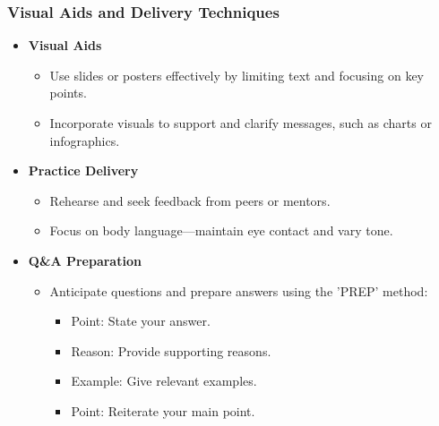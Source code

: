 \documentclass{beamer}
\begin{document}
\begin{frame}[fragile]
    \frametitle{Visual Aids and Delivery Techniques}
    \begin{itemize}
        \item \textbf{Visual Aids}
        \begin{itemize}
            \item Use slides or posters effectively by limiting text and focusing on key points.
            \item Incorporate visuals to support and clarify messages, such as charts or infographics.
        \end{itemize}

        \item \textbf{Practice Delivery}
        \begin{itemize}
            \item Rehearse and seek feedback from peers or mentors.
            \item Focus on body language—maintain eye contact and vary tone.
        \end{itemize}

        \item \textbf{Q\&A Preparation}
        \begin{itemize}
            \item Anticipate questions and prepare answers using the 'PREP' method:
            \begin{itemize}
                \item Point: State your answer.
                \item Reason: Provide supporting reasons.
                \item Example: Give relevant examples.
                \item Point: Reiterate your main point.
            \end{itemize}
        \end{itemize}
    \end{itemize}
\end{frame}
\end{document}
